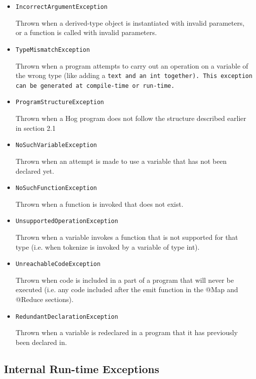 \documentclass{article}
\begin{document}
\begin{itemize}
  \item[] \tt IncorrectArgumentException \rm
  
  Thrown when a derived-type object is instantiated with invalid parameters, or a function is called with invalid parameters.
  
  \item[] \tt TypeMismatchException \rm
  
  Thrown when a program attempts to carry out an operation on a variable of the wrong type (like adding a \tt text \rm and an
  \tt int \rm together). This exception can be generated at compile-time or run-time.
  
  \item[] \tt ProgramStructureException \rm
  
  Thrown when a Hog program does not follow the structure described earlier in section 2.1

  \item[] \tt NoSuchVariableException \rm
  
  Thrown when an attempt is made to use a variable that has not been declared yet.

  \item[] \tt NoSuchFunctionException \rm
  
  Thrown when a function is invoked that does not exist.

  \item[] \tt UnsupportedOperationException \rm
  
  Thrown when a variable invokes a function that is not supported for that type (i.e. when tokenize is invoked by a variable of type int).

  \item[] \tt UnreachableCodeException \rm

  Thrown when code is included in a part of a program that will never be executed (i.e. any code included after the emit function in the @Map and @Reduce sections).

  \item[] \tt RedundantDeclarationException \rm

  Thrown when a variable is redeclared in a program that it has previously been declared in.

\end{itemize}


\subsection{Internal Run-time Exceptions} %
\label{sub:internal_run_time_exceptions}
\end{document}
